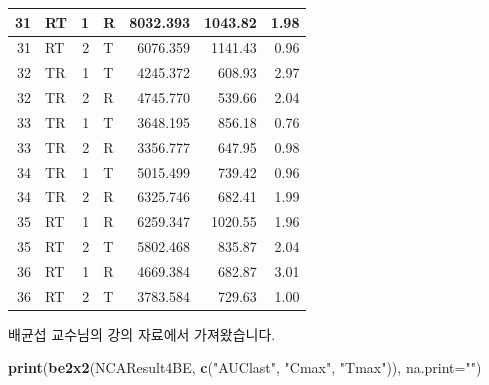 \documentclass[
  12pt,
]{krantz}
\newenvironment{Shaded}{\begin{snugshade}}{\end{snugshade}}
\newcommand{\DataTypeTok}[1]{\textcolor[rgb]{0.13,0.29,0.53}{#1}}
\newcommand{\KeywordTok}[1]{\textcolor[rgb]{0.13,0.29,0.53}{\textbf{#1}}}
\newcommand{\NormalTok}[1]{#1}
\newcommand{\StringTok}[1]{\textcolor[rgb]{0.31,0.60,0.02}{#1}}
\begin{document}
\begin{table}
\begin{tabular}[t]{r|l|r|l|r|r|r}
\hline
31 & RT & 1 & R & 8032.393 & 1043.82 & 1.98\\
\hline
31 & RT & 2 & T & 6076.359 & 1141.43 & 0.96\\
\hline
32 & TR & 1 & T & 4245.372 & 608.93 & 2.97\\
\hline
32 & TR & 2 & R & 4745.770 & 539.66 & 2.04\\
\hline
33 & TR & 1 & T & 3648.195 & 856.18 & 0.76\\
\hline
33 & TR & 2 & R & 3356.777 & 647.95 & 0.98\\
\hline
34 & TR & 1 & T & 5015.499 & 739.42 & 0.96\\
\hline
34 & TR & 2 & R & 6325.746 & 682.41 & 1.99\\
\hline
35 & RT & 1 & R & 6259.347 & 1020.55 & 1.96\\
\hline
35 & RT & 2 & T & 5802.468 & 835.87 & 2.04\\
\hline
36 & RT & 1 & R & 4669.384 & 682.87 & 3.01\\
\hline
36 & RT & 2 & T & 3783.584 & 729.63 & 1.00\\
\hline
\end{tabular}
\end{table}

배균섭 교수님의 강의 자료에서 가져왔습니다.

\begin{Shaded}
\begin{Highlighting}[]
\KeywordTok{print}\NormalTok{(}\KeywordTok{be2x2}\NormalTok{(NCAResult4BE, }\KeywordTok{c}\NormalTok{(}\StringTok{"AUClast"}\NormalTok{, }\StringTok{"Cmax"}\NormalTok{, }\StringTok{"Tmax"}\NormalTok{)), }\DataTypeTok{na.print=}\StringTok{""}\NormalTok{) }
\end{Highlighting}
\end{Shaded}
\end{document}
